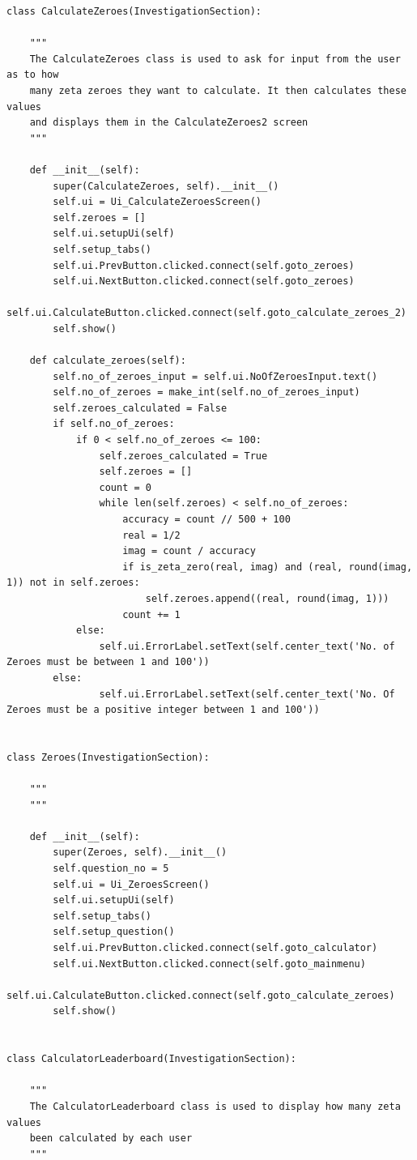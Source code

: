 \documentclass{article}
\begin{document}
\begin{lstlisting}
class CalculateZeroes(InvestigationSection):

    """
    The CalculateZeroes class is used to ask for input from the user as to how
    many zeta zeroes they want to calculate. It then calculates these values
    and displays them in the CalculateZeroes2 screen
    """

    def __init__(self):
        super(CalculateZeroes, self).__init__()
        self.ui = Ui_CalculateZeroesScreen()
        self.zeroes = []
        self.ui.setupUi(self)
        self.setup_tabs()
        self.ui.PrevButton.clicked.connect(self.goto_zeroes)
        self.ui.NextButton.clicked.connect(self.goto_zeroes)
        self.ui.CalculateButton.clicked.connect(self.goto_calculate_zeroes_2)
        self.show()

    def calculate_zeroes(self):
        self.no_of_zeroes_input = self.ui.NoOfZeroesInput.text()
        self.no_of_zeroes = make_int(self.no_of_zeroes_input)
        self.zeroes_calculated = False
        if self.no_of_zeroes:
            if 0 < self.no_of_zeroes <= 100:
                self.zeroes_calculated = True
                self.zeroes = []
                count = 0
                while len(self.zeroes) < self.no_of_zeroes:
                    accuracy = count // 500 + 100
                    real = 1/2
                    imag = count / accuracy
                    if is_zeta_zero(real, imag) and (real, round(imag, 1)) not in self.zeroes:
                        self.zeroes.append((real, round(imag, 1)))
                    count += 1
            else:
                self.ui.ErrorLabel.setText(self.center_text('No. of Zeroes must be between 1 and 100'))
        else:
                self.ui.ErrorLabel.setText(self.center_text('No. Of Zeroes must be a positive integer between 1 and 100'))


class Zeroes(InvestigationSection):

    """
    """

    def __init__(self):
        super(Zeroes, self).__init__()
        self.question_no = 5
        self.ui = Ui_ZeroesScreen()
        self.ui.setupUi(self)
        self.setup_tabs()
        self.setup_question()
        self.ui.PrevButton.clicked.connect(self.goto_calculator)
        self.ui.NextButton.clicked.connect(self.goto_mainmenu)
        self.ui.CalculateButton.clicked.connect(self.goto_calculate_zeroes)
        self.show()


class CalculatorLeaderboard(InvestigationSection):

    """
    The CalculatorLeaderboard class is used to display how many zeta values
    been calculated by each user
    """


\end{lstlisting}
\end{document}
